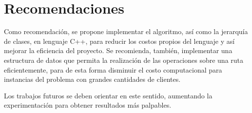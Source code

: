 \documentclass[a4paper,10pt,twocolumn]{article}
\begin{document}



\section{Recomendaciones}\label{sec:rec}

  Como recomendación, se propone implementar el algoritmo, así como la jerarquía de
  clases, en lenguaje \textsc{C++}, para reducir los costos propios del lenguaje
  y así mejorar la eficiencia del proyecto. Se recomienda, también, implementar una
  estructura de datos que permita la realización de las operaciones sobre una ruta
  eficientemente, para de esta forma disminuir el costo computacional para instancias
  del problema con grandes cantidades de clientes.
  
  Los trabajos futuros se deben orientar en este sentido, aumentando la experimentación
  para obtener resultados más palpables.
  
\end{document}
